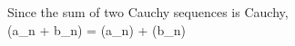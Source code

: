 \documentclass[preview]{standalone}
\begin{document}
\begin{center}
Since the sum of two Cauchy sequences is Cauchy,\\(a_n + b_n) = (a_n) + (b_n)
\end{center}
\end{document}
